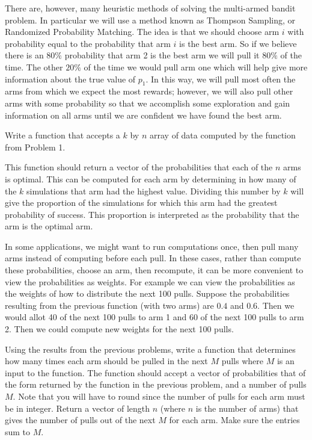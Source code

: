 There are, however, many heuristic methods of solving the multi-armed bandit problem.  In particular we will use a method known as Thompson Sampling, or Randomized Probability Matching.  The idea is that we should choose arm $i$ with probability equal to the probability that arm $i$ is the best arm.  So if we believe there is an $80\%$ probability that arm 2 is the best arm we will pull it $80\%$ of the time.  The other $20\%$ of the time we would pull arm one which will help give more information about the true value of $p_1$.  In this way, we will pull most often the arms from which we expect the most rewards; however, we will also pull other arms with some probability so that we accomplish some exploration and gain information on all arms until we are confident we have found the best arm.

\begin{problem}
Write a function that accepts a $k$ by $n$ array of data computed by the function from Problem 1.

This function should return a vector of the probabilities that each of the $n$ arms is optimal.  This can be computed for each arm by determining in how many of the $k$ simulations that arm had the highest value.  Dividing this number by $k$ will give the proportion of the simulations for which this arm had the greatest probability of success.  This proportion is interpreted as the probability that the arm is the optimal arm.
\end{problem}

In some applications, we might want to run computations once, then pull many arms instead of computing before each pull.  In these cases, rather than compute these probabilities, choose an arm, then recompute, it can be more convenient to view the probabilities as weights.  For example we can view the probabilities as the weights of how to distribute the next 100 pulls.  Suppose the probabilities resulting from the previous function (with two arms) are $0.4$ and $0.6$.  Then we would allot 40 of the next 100 pulls to arm 1 and 60 of the next 100 pulls to arm 2.  Then we could compute new weights for the next 100 pulls.

\begin{problem}
Using the results from the previous problems, write a function that determines how many times each arm should be pulled in the next $M$ pulls where $M$ is an input to the function.  The function should accept a vector of probabilities that of the form returned by the function in the previous problem, and a number of pulls $M$.  Note that you will have to round since the number of pulls for each arm must be in integer.  Return a vector of length $n$ (where $n$ is the number of arms) that gives the number of pulls out of the next $M$ for each arm.  Make sure the entries sum to $M$.
\end{problem}

